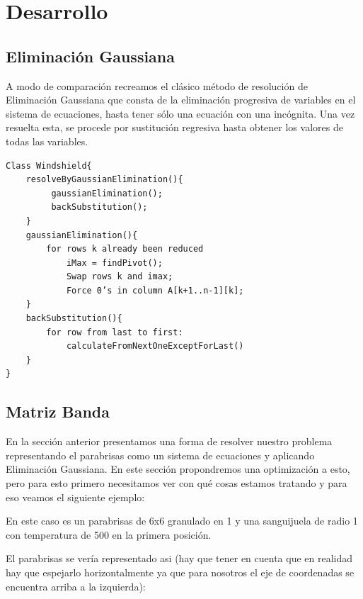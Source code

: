 \section{Desarrollo}

\subsection{Eliminación Gaussiana}
 A modo de comparación recreamos el clásico método de resolución de Eliminación Gaussiana que consta de la eliminación progresiva de variables en el sistema de ecuaciones, hasta tener sólo una ecuación con una incógnita. Una vez resuelta esta, se procede por sustitución regresiva hasta obtener los valores de todas las variables.

\begin{verbatim}
Class Windshield{
    resolveByGaussianElimination(){
         gaussianElimination();
         backSubstitution();
    } 
    gaussianElimination(){
        for rows k already been reduced
            iMax = findPivot();
            Swap rows k and imax;
            Force 0’s in column A[k+1..n-1][k];
    }
    backSubstitution(){
        for row from last to first:
            calculateFromNextOneExceptForLast()
    }
}
\end{verbatim}

\subsection{Matriz Banda}

En la sección anterior presentamos una forma de resolver nuestro problema representando el parabrisas como un sistema de ecuaciones y aplicando Eliminación Gaussiana. En este sección propondremos una optimización a esto, pero para esto primero necesitamos ver con qué cosas estamos tratando y para eso veamos el siguiente ejemplo:

En este caso es un parabrisas de 6x6 granulado en 1 y una sanguijuela de radio 1 con temperatura de 500 en la primera posición.

El parabrisas se vería representado asi (hay que tener en cuenta que en realidad hay que espejarlo horizontalmente ya que para nosotros el eje de coordenadas se encuentra arriba a la izquierda):

